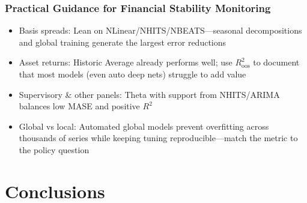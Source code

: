 \documentclass[ignorenonframetext, 9pt]{beamer}
\begin{document}
\begin{frame}
  \frametitle{Practical Guidance for Financial Stability Monitoring}
  \begin{itemize}
  \item \alert{Basis spreads:} Lean on NLinear/NHITS/NBEATS—seasonal decompositions and global training generate the largest error reductions
  \vspace{0.3cm}
  \item \alert{Asset returns:} Historic Average already performs well; use $R^2_{\text{oos}}$ to document that most models (even auto deep nets) struggle to add value
  \vspace{0.3cm}
  \item \alert{Supervisory \& other panels:} Theta with support from NHITS/ARIMA balances low MASE and positive $R^2$
  \vspace{0.3cm}
  \item \alert{Global vs local:} Automated global models prevent overfitting across thousands of series while keeping tuning reproducible—match the metric to the policy question
  \end{itemize}
\end{frame}

\section{Conclusions}
\end{document}
